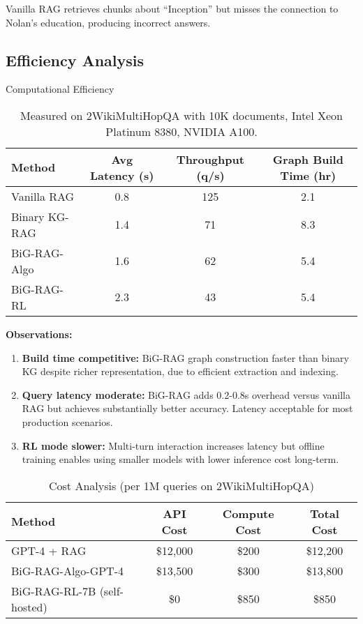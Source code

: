 \documentclass[11pt,a4paper]{article}
\begin{document}
Vanilla RAG retrieves chunks about ``Inception'' but misses the connection to Nolan's education, producing incorrect answers.

\subsection{Efficiency Analysis}

\begin{table}[h]
\centering
\caption{Computational Efficiency}
\begin{tabular}{lccc}
\toprule
\textbf{Method} & \textbf{Avg Latency (s)} & \textbf{Throughput (q/s)} & \textbf{Graph Build Time (hr)} \\
\midrule
Vanilla RAG & 0.8 & 125 & 2.1 \\
Binary KG-RAG & 1.4 & 71 & 8.3 \\
BiG-RAG-Algo & 1.6 & 62 & 5.4 \\
BiG-RAG-RL & 2.3 & 43 & 5.4 \\
\bottomrule
\end{tabular}
\caption*{Measured on 2WikiMultiHopQA with 10K documents, Intel Xeon Platinum 8380, NVIDIA A100.}
\end{table}

\textbf{Observations:}

\begin{enumerate}
    \item \textbf{Build time competitive:} BiG-RAG graph construction faster than binary KG despite richer representation, due to efficient extraction and indexing.

    \item \textbf{Query latency moderate:} BiG-RAG adds 0.2-0.8s overhead versus vanilla RAG but achieves substantially better accuracy. Latency acceptable for most production scenarios.

    \item \textbf{RL mode slower:} Multi-turn interaction increases latency but offline training enables using smaller models with lower inference cost long-term.
\end{enumerate}

\begin{table}[h]
\centering
\caption{Cost Analysis (per 1M queries on 2WikiMultiHopQA)}
\begin{tabular}{lccc}
\toprule
\textbf{Method} & \textbf{API Cost} & \textbf{Compute Cost} & \textbf{Total Cost} \\
\midrule
GPT-4 + RAG & \$12,000 & \$200 & \$12,200 \\
BiG-RAG-Algo-GPT-4 & \$13,500 & \$300 & \$13,800 \\
BiG-RAG-RL-7B (self-hosted) & \$0 & \$850 & \$850 \\
\bottomrule
\end{tabular}
\end{table}
\end{document}
